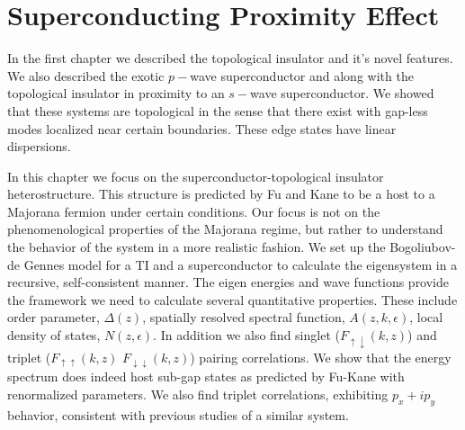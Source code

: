 
\chapter{Superconducting Proximity Effect}
In the first chapter we described the topological insulator and it's novel features. We also described the exotic $p-$wave superconductor and along with the topological insulator in proximity to an $s-$wave superconductor. We showed that these systems are topological in the sense that there exist with gap-less modes localized near certain boundaries. These edge states have linear dispersions.

In this chapter we focus on the superconductor-topological insulator heterostructure. This structure is predicted by Fu and Kane to be a host to a Majorana fermion under certain conditions. Our focus is not on the phenomenological properties of the Majorana regime, but rather to understand the behavior of the system in a more realistic fashion. We set up the Bogoliubov-de Gennes model for a TI and a superconductor to calculate the eigensystem in a recursive, self-consistent manner. The eigen energies and wave functions provide the framework we need to calculate several quantitative properties. These include order parameter, $\Delta(z)$, spatially resolved spectral function, $A(z,k,\epsilon)$, local density of states, $N(z,\epsilon)$. In addition we also find singlet ($F_{\uparrow \downarrow}(k,z)$) and triplet ($F_{\uparrow \uparrow}(k,z)$ $F_{\downarrow \downarrow}(k,z)$) pairing correlations. We show that the energy spectrum does indeed host sub-gap states as predicted by Fu-Kane with renormalized parameters. We also find triplet correlations, exhibiting $p_x+ip_y$ behavior, consistent with previous studies of a similar system.

